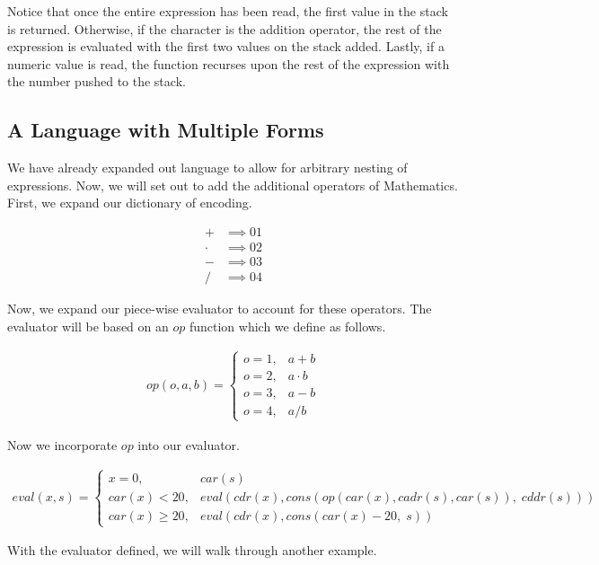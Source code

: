 \documentclass{article}
\begin{document}
Notice that once the entire expression has been read, the first value in the stack is returned. 
Otherwise, if the character is the addition operator, the rest of the expression is evaluated with the
first two values on the stack added. Lastly, if a numeric value is read, the function recurses upon the
rest of the expression with the number pushed to the stack.

\subsection{A Language with Multiple Forms}
We have already expanded out language to allow for arbitrary nesting of expressions. Now, we will set
out to add the additional operators of Mathematics. First, we expand our dictionary of encoding.

\begin{align*}
    + &\implies 01
\\  \cdot &\implies 02
\\  - &\implies 03
\\  / &\implies 04
\end{align*}

Now, we expand our piece-wise evaluator to account for these operators. The evaluator will be based
on an $op$ function which we define as follows.

\begin{align*}
op(o, a, b) = \left\{
  \begin{array}{lr}
        o = 1, &a + b
    \\  o = 2, &a \cdot b
    \\  o = 3, &a - b
    \\  o = 4, &a / b
  \end{array}
\right.
\end{align*}

Now we incorporate $op$ into our evaluator.

\begin{align*}
eval(x, s) = \left\{
  \begin{array}{lr}
        x = 0, &car(s)
    \\  car(x) < 20, &eval(cdr(x), cons(op(car(x), cadr(s), car(s)), \; cddr(s)))
    \\  car(x) \ge 20, &eval(cdr(x), cons(car(x) - 20, \; s))
  \end{array}
\right.
\end{align*}

With the evaluator defined, we will walk through another example.
\end{document}
